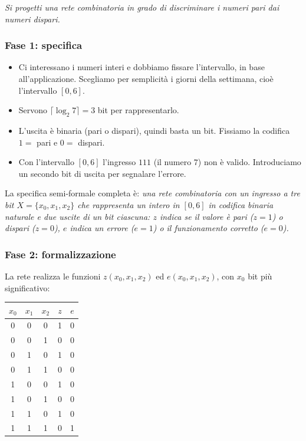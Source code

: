 \documentclass[11pt,a4paper]{article}
\begin{document}
\emph{Si progetti una rete combinatoria in grado di discriminare i numeri pari dai numeri dispari.}

\subsubsection*{Fase 1: specifica}

\begin{itemize}
    \item Ci interessano i numeri interi e dobbiamo fissare l'intervallo, in base all'applicazione. Scegliamo per semplicità i giorni della settimana, cioè l'intervallo $[0, 6]$.
    \item Servono $\lceil \log_2 7 \rceil = 3$ bit per rappresentarlo.
    \item L'uscita è binaria (pari o dispari), quindi basta un bit. Fissiamo la codifica $1 = $ pari e $0 = $ dispari.
    \item Con l'intervallo $[0,6]$ l'ingresso $111$ (il numero $7$) non è valido. Introduciamo un secondo bit di uscita per segnalare l'errore.
\end{itemize}

La specifica semi-formale completa è: \emph{una rete combinatoria con un ingresso a tre bit $X = \{x_0, x_1, x_2\}$ che rappresenta un intero in $[0,6]$ in codifica binaria naturale e due uscite di un bit ciascuna: $z$ indica se il valore è pari ($z = 1$) o dispari ($z = 0$), $e$ indica un errore ($e = 1$) o il funzionamento corretto ($e = 0$).}

\subsubsection*{Fase 2: formalizzazione}

La rete realizza le funzioni $z(x_0,x_1,x_2)$ ed $e(x_0,x_1,x_2)$, con $x_0$ bit più significativo:
\begin{center}
\begin{tabular}{ccc|cc}
\toprule
$x_0$ & $x_1$ & $x_2$ & $z$ & $e$ \\
\midrule
0 & 0 & 0 & 1 & 0 \\
0 & 0 & 1 & 0 & 0 \\
0 & 1 & 0 & 1 & 0 \\
0 & 1 & 1 & 0 & 0 \\
1 & 0 & 0 & 1 & 0 \\
1 & 0 & 1 & 0 & 0 \\
1 & 1 & 0 & 1 & 0 \\
1 & 1 & 1 & 0 & 1 \\
\bottomrule
\end{tabular}
\end{center}
\end{document}
